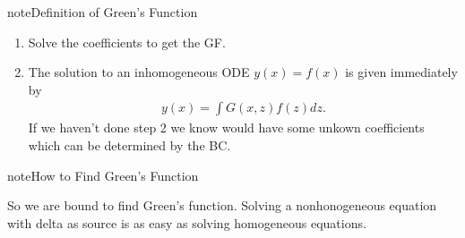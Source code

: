 \documentclass[letterpaper,10pt,english]{sphinxmanual}
\begin{document}
\begin{sphinxadmonition}{note}{Definition of Green’s Function}
\begin{enumerate}
\item {} 
Solve the coefficients to get the GF.

\item {} 
The solution to an inhomogeneous ODE  \(y(x)=f(x)\) is given immediately by
\begin{equation*}
\begin{split}y(x) = \int G(x,z) f(z) dz.\end{split}
\end{equation*}
If we haven’t done step 2 we know would have some unkown coefficients which can be determined by the BC.

\end{enumerate}
\end{sphinxadmonition}

\begin{sphinxadmonition}{note}{How to Find Green’s Function}

So we are bound to find Green’s function. Solving a nonhonogeneous equation with delta as source is as easy as solving homogeneous equations.


\end{sphinxadmonition}
\end{document}
